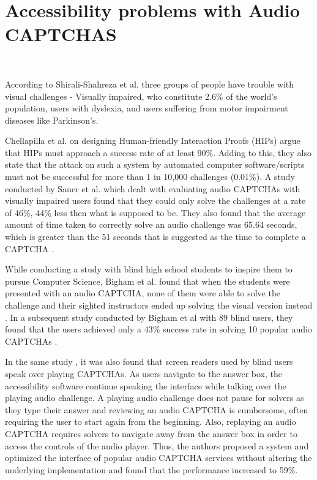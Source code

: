 \section{Accessibility problems with Audio CAPTCHAS }{}\mbox \
\label{sec:previous}

According to Shirali-Shahreza et al. \cite{shirali2011accessibility} three groups of people have trouble with visual challenges - Visually impaired, who constitute 2.6\% of the world's population, users with dyslexia, and users suffering from motor impairment diseases like Parkinson's.\newline

Chellapilla et al. \cite{chellapilla2005designing} on designing Human-friendly Interaction Proofs (HIPs) argue that HIPs must approach a success rate of at least 90\%. Adding to this, they also state that the attack on such a system by automated computer software/scripts must not be successful for more than 1 in 10,000 challenges (0.01\%). A study conducted by Sauer et al. \cite{sauer2008towards} which dealt with evaluating audio CAPTCHAs with visually impaired users found that they could only solve the challenges at a rate of 46\%, 44\% less then what is supposed to be. They also found that the average amount of time taken to correctly solve an audio challenge was 65.64 seconds, which is greater than the 51 seconds that is suggested as the time to complete a CAPTCHA \cite{schluessler2007bot}.\newline

While conducting a study with blind high school students to inspire them to pursue Computer Science, Bigham et al. found that when the students were presented with an audio CAPTCHA, none of them were able to solve the challenge and their sighted instructors ended up solving the visual version instead \cite{bigham2008inspiring}. In a subsequent study conducted by Bigham et al with 89 blind users, they found that the users achieved only a 43\% success rate in solving 10 popular audio CAPTCHAs \cite{bigham2009evaluating}. \newline

In the same study \cite{bigham2009evaluating}, it was also found that screen readers used by blind users speak over playing CAPTCHAs. As users navigate to the answer box, the accessibility software continue speaking the interface while talking over the playing audio challenge. A playing audio challenge does not pause for solvers as they type their answer and reviewing an audio CAPTCHA is cumbersome, often requiring the user to start again from the beginning. Also, replaying an audio CAPTCHA requires solvers to navigate away from the answer box in order to access the controls of the audio player. Thus, the authors proposed a system and optimized the interface of popular audio CAPTCHA services without altering the underlying implementation and found that the performance increased to 59\%. \newline